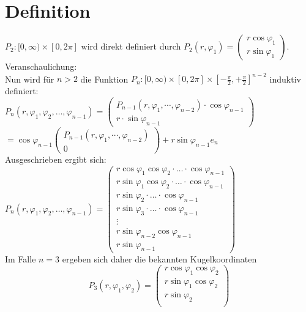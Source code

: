 \documentclass[a4paper,11pt]{report}
\theoremstyle{definition}
\begin{document}
\section{Definition}
$P_2:[0, \infty)\times [0, 2\pi]$ wird direkt definiert durch $P_2(r,\varphi_1)=\begin{pmatrix}
r\cos\varphi_1\\ r\sin\varphi_1\end{pmatrix}$.\\
Veranschaulichung: \\%
Nun wird für $n>2$ die Funktion $P_n:[0,\infty)\times[0, 2\pi]\times[-\frac{\pi}{2},+\frac{\pi}{2}]^{n-2}$ induktiv definiert:\\[0.5em]
$P_n(r,\varphi_1, \varphi_2, \ldots, \varphi_{n-1})=\begin{pmatrix}
P_{n-1}(r,\varphi_1,\cdots,\varphi_{n-2})\cdot\cos\varphi_{n-1} \\ r\cdot\sin \varphi_{n-1}\end{pmatrix}
$ \\ $= \cos\varphi_{n-1}\begin{pmatrix}P_{n-1}(r,\varphi_1,\cdots,\varphi_{n-2}) \\ 0 \end{pmatrix}+r\sin\varphi_{n-1}e_n$\\
Ausgeschrieben ergibt sich:\\
$P_n(r,\varphi_1, \varphi_2, \ldots, \varphi_{n-1})= \begin{pmatrix}r\cos\varphi_1\cos\varphi_2\cdot\ldots\cdot\cos\varphi_{n-1} \\ r\sin\varphi_1\cos\varphi_2\cdot\ldots\cdot\cos\varphi_{n-1} \\
r\sin\varphi_2\cdot\ldots\cdot\cos\varphi_{n-1} \\
r\sin\varphi_3\cdot\ldots\cdot\cos\varphi_{n-1} \\
\vdots \\
r\sin\varphi_{n-2}\cos\varphi_{n-1} \\
r \sin\varphi_{n-1}
\end{pmatrix}$\\
Im Falle $n=3$ ergeben sich daher die bekannten Kugelkoordinaten
$$P_3(r,\varphi_1, \varphi_2)=
\begin{pmatrix}r\cos\varphi_1\cos\varphi_2 \\
r\sin\varphi_1\cos\varphi_2\\
r\sin\varphi_2\\ \end{pmatrix}$$
\end{document}
